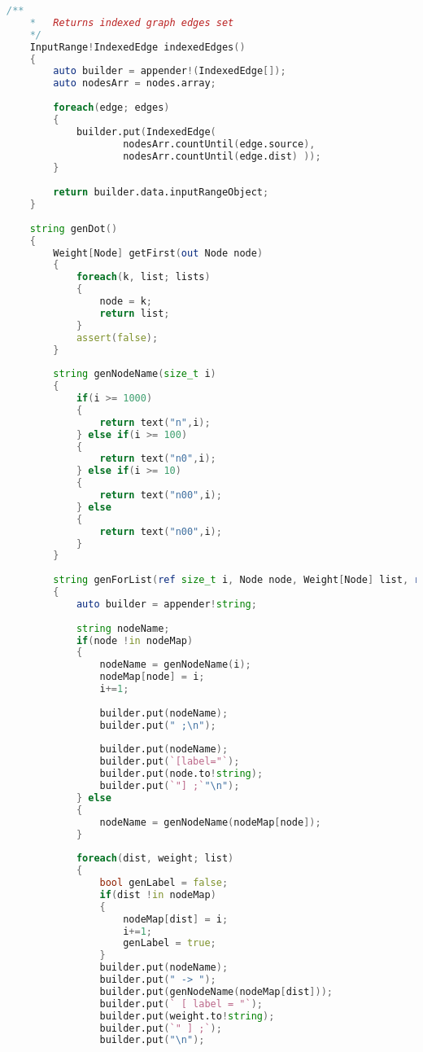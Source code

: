 \documentclass[russian,utf8,emptystyle]{eskdtext}
\begin{document}
\begin{lstlisting}[language=D]
    /**
    *   Returns indexed graph edges set
    */
    InputRange!IndexedEdge indexedEdges()
    {
        auto builder = appender!(IndexedEdge[]);
        auto nodesArr = nodes.array;
         
        foreach(edge; edges)
        {
            builder.put(IndexedEdge(
                    nodesArr.countUntil(edge.source),
                    nodesArr.countUntil(edge.dist) ));
        }
        
        return builder.data.inputRangeObject;
    }
    
    string genDot()
    {
        Weight[Node] getFirst(out Node node)
        {
            foreach(k, list; lists)
            {
                node = k;
                return list;
            }
            assert(false);
        }
        
        string genNodeName(size_t i)
        {
            if(i >= 1000)
            {
                return text("n",i);
            } else if(i >= 100)
            {
                return text("n0",i);
            } else if(i >= 10)
            {
                return text("n00",i);
            } else
            {
                return text("n00",i);
            }
        }
        
        string genForList(ref size_t i, Node node, Weight[Node] list, ref size_t[Node] nodeMap)
        {
            auto builder = appender!string;
            
            string nodeName;
            if(node !in nodeMap)
            {
                nodeName = genNodeName(i);
                nodeMap[node] = i;
                i+=1;
                
                builder.put(nodeName);
                builder.put(" ;\n");
                
                builder.put(nodeName);
                builder.put(`[label="`);
                builder.put(node.to!string);
                builder.put(`"] ;`"\n"); 
            } else
            {
                nodeName = genNodeName(nodeMap[node]);
            }
            
            foreach(dist, weight; list)
            {
                bool genLabel = false;
                if(dist !in nodeMap)
                {
                    nodeMap[dist] = i;
                    i+=1;
                    genLabel = true;
                }
                builder.put(nodeName);
                builder.put(" -> ");
                builder.put(genNodeName(nodeMap[dist]));
                builder.put(` [ label = "`);
                builder.put(weight.to!string);
                builder.put(`" ] ;`);
                builder.put("\n");
                

\end{lstlisting}
\end{document}
